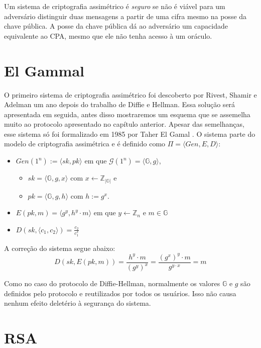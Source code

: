 Um sistema de criptografia assimétrico é {\em seguro} se não é viável para um adversário distinguir duas mensagens a partir de uma cifra mesmo na posse da chave pública.
A posse da chave pública dá ao adversário um capacidade equivalente ao CPA, mesmo que ele não tenha acesso à um oráculo.


\section{El Gammal}
\label{sec:el-gammal}
O primeiro sistema de criptografia assimétrico foi descoberto por Rivest, Shamir e Adelman um ano depois do trabalho de Diffie e Hellman.
Essa solução será apresentada em seguida, antes disso mostraremos um esquema que se assemelha muito ao protocolo apresentado no capítulo anterior.
Apesar das semelhanças, esse sistema só foi formalizado em 1985 por Taher El Gamal \cite{ElGamal85}.
O sistema parte do modelo de criptografia assimétrica e é definido como $\Pi= \langle Gen, E, D\rangle$:
\begin{itemize}
\item $Gen(1^n) := \langle sk, pk \rangle$ em que $\mathcal{G}(1^n) = \langle \mathbb{G}, g \rangle$,
\begin{itemize}
\item  $sk = \langle \mathbb{G}, g, x \rangle$ com $x \leftarrow \mathbb{Z}_{|\mathbb{G}|}$ e
\item  $pk = \langle \mathbb{G}, g, h \rangle$ com $h := g^x$.
\end{itemize}

\item $E(pk, m) = \langle g^y, h^y \cdot m\rangle$ em que $y \leftarrow \mathbb{Z}_n$ e $m \in \mathbb{G}$
\item $D(sk, \langle c_1, c_2 \rangle) = \frac{c_2}{c_1^x}$
\end{itemize}

A correção do sistema segue abaixo:
\begin{displaymath}
  D(sk, E(pk, m)) =  \frac{h^y \cdot m}{(g^y)^x} = \frac{(g^x)^y \cdot m}{g^{y \cdot x}} = m 
\end{displaymath}

Como no caso do protocolo de Diffie-Hellman, normalmente os valores $\mathbb{G}$ e $g$ são definidos pelo protocolo e reutilizados por todos os usuários.
Isso não causa nenhum efeito deletério à segurança do sistema.

\section{RSA}
\label{sec:rsa}

